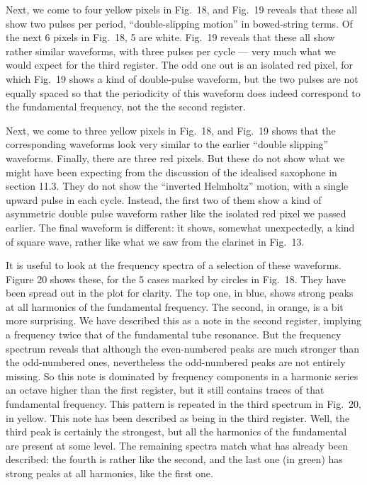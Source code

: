 
  Next, we come to four yellow pixels in Fig.\ 18, and Fig.\ 19 reveals that 
  these all show two pulses per period, “double-slipping motion” in 
  bowed-string terms. Of the next 6 pixels in Fig.\ 18, 5 are white. Fig.\ 19 
  reveals that these all show rather similar waveforms, with three pulses per 
  cycle — very much what we would expect for the third register. The odd one 
  out is an isolated red pixel, for which Fig.\ 19 shows a kind of double-pulse 
  waveform, but the two pulses are not equally spaced so that the periodicity 
  of this waveform does indeed correspond to the fundamental frequency, not the 
  the second register. 

  Next, we come to three yellow pixels in Fig.\ 18, and Fig.\ 19 shows that the 
  corresponding waveforms look very similar to the earlier “double slipping” 
  waveforms. Finally, there are three red pixels. But these do not show what we 
  might have been expecting from the discussion of the idealised saxophone in 
  section 11.3. They do not show the “inverted Helmholtz” motion, with a single 
  upward pulse in each cycle. Instead, the first two of them show a kind of 
  asymmetric double pulse waveform rather like the isolated red pixel we passed 
  earlier. The final waveform is different: it shows, somewhat unexpectedly, a 
  kind of square wave, rather like what we saw from the clarinet in Fig.\ 13. 

  It is useful to look at the frequency spectra of a selection of these 
  waveforms. Figure 20 shows these, for the 5 cases marked by circles in Fig.\ 
  18. They have been spread out in the plot for clarity. The top one, in blue, 
  shows strong peaks at all harmonics of the fundamental frequency. The second, 
  in orange, is a bit more surprising. We have described this as a note in the 
  second register, implying a frequency twice that of the fundamental tube 
  resonance. But the frequency spectrum reveals that although the even-numbered 
  peaks are much stronger than the odd-numbered ones, nevertheless the 
  odd-numbered peaks are not entirely missing. So this note is dominated by 
  frequency components in a harmonic series an octave higher than the first 
  register, but it still contains traces of that fundamental frequency. This 
  pattern is repeated in the third spectrum in Fig.\ 20, in yellow. This note 
  has been described as being in the third register. Well, the third peak is 
  certainly the strongest, but all the harmonics of the fundamental are present 
  at some level. The remaining spectra match what has already been described: 
  the fourth is rather like the second, and the last one (in green) has strong 
  peaks at all harmonics, like the first one. 


